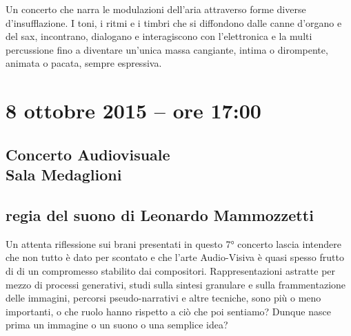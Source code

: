 \documentclass[8pt, twoside, a5paper]{extreport}
\begin{document}
Un concerto che narra le modulazioni dell’aria attraverso forme diverse d’insufflazione. I toni, i ritmi e i timbri che si diffondono dalle canne d’organo e del sax, incontrano, dialogano e interagiscono con l’elettronica e la multi percussione fino a diventare un’unica massa cangiante, intima o dirompente, animata o pacata, sempre espressiva.



\begin{multicols}{2}




\end{multicols}

\clearpage


\section*{8 ottobre 2015 -- ore 17:00}

\subsection*{{\small Concerto Audiovisuale} \\
	\textsf{Sala Medaglioni}}

{\fontsize{30}{30} }

\subsection*{\textsf{regia del suono di Leonardo Mammozzetti}}

Un attenta riflessione sui brani presentati in questo 7° concerto lascia intendere che non tutto è dato per scontato e che l'arte Audio-Visiva è quasi spesso frutto di di un compromesso stabilito dai compositori. Rappresentazioni astratte per mezzo di processi generativi, studi sulla sintesi granulare e sulla frammentazione delle immagini, percorsi pseudo-narrativi e altre tecniche, sono più o meno importanti, o che ruolo hanno rispetto a ciò che poi sentiamo? 
Dunque nasce prima un immagine o un suono o una semplice idea?
\end{document}
